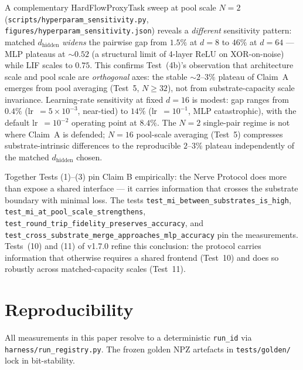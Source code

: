 \documentclass[10pt,twocolumn]{article}
\begin{document}
A complementary HardFlowProxyTask sweep at pool scale $N=2$
(\texttt{scripts/hyperparam\_sensitivity.py},
\texttt{figures/hyperparam\_sensitivity.json}) reveals a
\emph{different} sensitivity pattern: matched $d_{\mathrm{hidden}}$
\emph{widens} the pairwise gap from $1.5\%$ at $d=8$ to $46\%$ at
$d=64$ --- MLP plateaus at $\sim 0.52$ (a structural limit of
4-layer ReLU on XOR-on-noise) while LIF scales to $0.75$. This
confirms Test~(4b)'s observation that architecture scale and pool
scale are \emph{orthogonal} axes: the stable $\sim 2$--$3\%$
plateau of Claim~A emerges from pool averaging (Test~5,
$N \geq 32$), not from substrate-capacity scale invariance.
Learning-rate sensitivity at fixed $d=16$ is modest: gap ranges
from $0.4\%$ (lr~$=5 \times 10^{-3}$, near-tied) to $14\%$
(lr~$=10^{-1}$, MLP catastrophic), with the default lr~$=10^{-2}$
operating point at $8.4\%$. The $N=2$ single-pair regime is not
where Claim~A is defended; $N=16$ pool-scale averaging (Test~5)
compresses substrate-intrinsic differences to the reproducible
$2$--$3\%$ plateau independently of the matched $d_{\mathrm{hidden}}$
chosen.

Together Tests (1)--(3) pin Claim B empirically: the Nerve Protocol does more than expose a shared interface --- it carries information that crosses the substrate boundary with minimal loss. The tests \texttt{test\_mi\_between\_substrates\_is\_high}, \texttt{test\_mi\_at\_pool\_scale\_strengthens}, \texttt{test\_round\_trip\_fidelity\_preserves\_accuracy}, and \texttt{test\_cross\_substrate\_merge\_approaches\_mlp\_accuracy} pin the measurements. Tests~(10) and (11) of v1.7.0 refine this conclusion: the protocol carries information that otherwise requires a shared frontend (Test~10) and does so robustly across matched-capacity scales (Test~11).

\section{Reproducibility}

All measurements in this paper resolve to a deterministic \texttt{run\_id} via \texttt{harness/run\_registry.py}. The frozen golden NPZ artefacts in \texttt{tests/golden/} lock in bit-stability.
\end{document}
